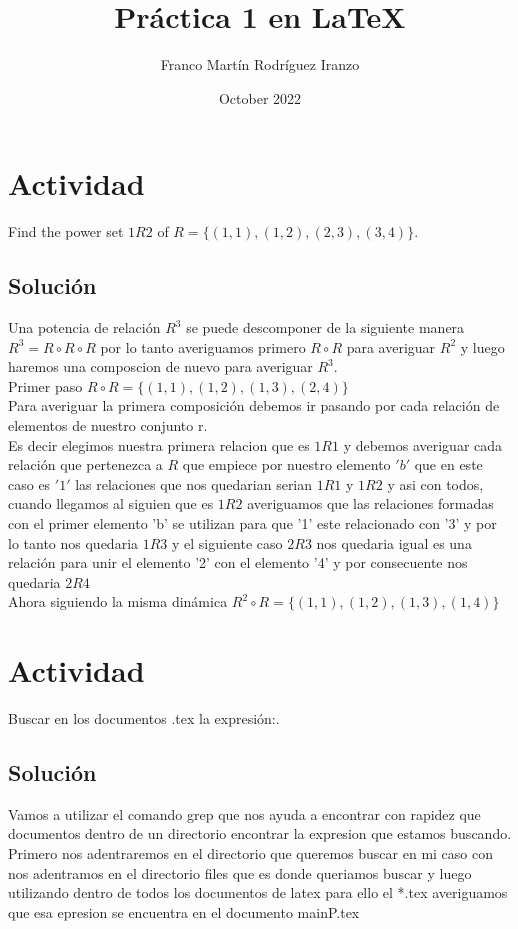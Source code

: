 \documentclass{article}
\title{\textbf{Práctica 1 en \LaTeX}}
\author{Franco Martín Rodríguez Iranzo}
\date{October 2022}
\begin{document}
\maketitle


\section{Actividad }
    Find the power set $1R2$  of $R=\{(1,1),(1,2),(2,3),(3,4)\}$.
        \subsection{Solución}
        Una potencia de relación $R^3$ se puede descomponer de la siguiente manera $R^3= R \circ R \circ R$ por lo tanto averiguamos primero  $R \circ R$ para averiguar $R^2$ y luego haremos una composcion de nuevo para averiguar $R^3$.\\
        Primer paso $R \circ R = \{(1,1),(1,2),(1,3),(2,4)\}$ \\
        Para averiguar la primera composición debemos ir pasando por cada relación de elementos de nuestro conjunto r.\\
        Es decir elegimos nuestra primera relacion que es $1R1$ y debemos averiguar cada relación que pertenezca a $R$ que empiece por nuestro elemento $'b'$ que en este caso es $'1'$ las relaciones que nos quedarian serian $1R1$ y $1R2$ y asi con todos, cuando llegamos al siguien que es $1R2$ averiguamos que las relaciones formadas con el primer elemento 'b' se utilizan para que '1' este relacionado con '3' y por lo tanto nos quedaria $1R3$ y el siguiente caso $2R3$ nos quedaria igual es una relación para unir el elemento '2' con el elemento '4' y por consecuente nos quedaria $2R4$\\
        Ahora siguiendo la misma dinámica 
        $R^2 \circ R =  \{(1,1),(1,2),(1,3),(1,4)\}$   




\section{Actividad }
     Buscar en los documentos .tex la expresión:. 
     \subsection{Solución}
     Vamos a utilizar el comando grep que nos ayuda a encontrar con rapidez que documentos dentro de un directorio encontrar la expresion que estamos buscando.
    Primero nos adentraremos en el directorio que queremos buscar en mi caso con  nos adentramos en el directorio files que es donde queriamos buscar y luego 
    utilizando  dentro de todos los documentos de latex para ello el *.tex averiguamos que esa epresion se encuentra en el documento mainP.tex
\end{document}
